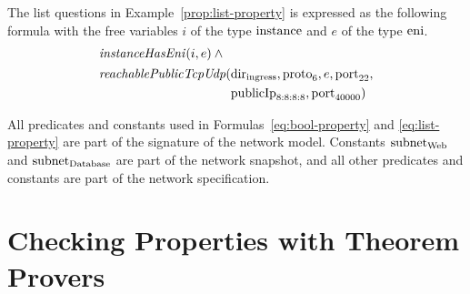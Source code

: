
The list questions in Example~\ref{prop:list-property} is expressed as the following formula with the free variables $i$ of the type $\mathrm{instance}$ and $e$ of the type $\mathrm{eni}$. 
\begin{equation}\label{eq:list-property}
\begin{aligned}
&\mathit{instanceHasEni}(i,e)\:\wedge~\\
&\begin{aligned}
   \mathit{reachablePublicTcpUdp}(&\mathrm{dir}_\text{ingress}, \mathrm{proto}_6, e, \mathrm{port}_{22},\\
                                &\mathrm{publicIp}_\text{8:8:8:8}, \mathrm{port}_\text{40000})
 \end{aligned}
\end{aligned}
\end{equation}

All predicates and constants used in Formulas~\ref{eq:bool-property} and \ref{eq:list-property} are part of the signature of the network model. Constants $\mathrm{subnet}_\text{Web}$ and $\mathrm{subnet}_\text{Database}$ are part of the network snapshot, and all other predicates and constants are part of the network specification.

% 

\section{Checking Properties with Theorem Provers}
\label{sect:aws/fol}

